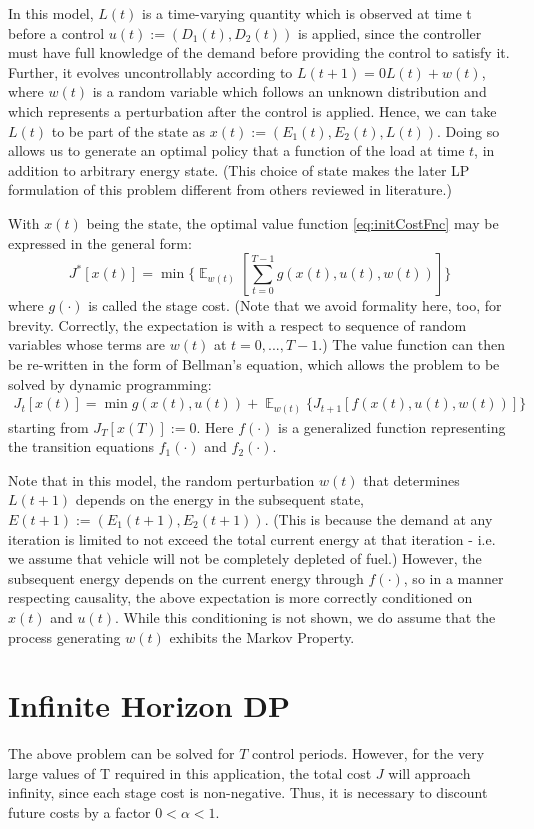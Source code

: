 \documentclass[conference]{IEEEtran}
\DeclareMathOperator{\E}{\mathbb{E}}
\begin{document}
In this model, $L(t)$ is a time-varying quantity which is observed at time t before a control $u(t):=(D_{1}(t),D_{2}(t))$ is applied, since the controller must have full knowledge of the demand before providing the control to satisfy it. Further, it evolves uncontrollably according to $L(t+1)=0L(t)+w(t)$, where $w(t)$ is a random variable which follows an unknown distribution and which represents a perturbation after the control is applied. Hence, we can take $L(t)$ to be part of the state as $x(t):=(E_{1}(t),E_{2}(t),L(t))$. Doing so allows us to generate an optimal policy that a function of the load at time $t$, in addition to arbitrary energy state. (This choice of state makes the later LP formulation of this problem different from others reviewed in literature.)

With $x(t)$ being the state, the optimal value function \eqref{eq:initCostFnc} may be expressed in the general form:
\begin{equation}J^{*}[x(t)]=\min \Biggl\{\mathop{\E}_{w(t)}\left[\sum_{t=0}^{T-1}g(x(t),u(t),w(t))\right]\Biggr\}\end{equation}
where $g(\cdot)$ is called the stage cost. (Note that we avoid formality here, too, for brevity. Correctly, the expectation is with a respect to sequence of random variables whose terms are $w(t)$ at $t=0,...,T-1$.) The value function can then be re-written in the form of Bellman's equation, which allows the problem to be solved by dynamic programming:
\begin{multline} \label{eq:FHDP}
J_{t}[x(t)]=\min g(x(t),u(t)) + \mathop{\E}_{w(t)} \{J_{t+1}[f(x(t),u(t),w(t))]\}
\end{multline}
starting from $J_{T}[x(T)]:=0$. Here $f(\cdot)$ is a generalized function representing the transition equations $f_{1}(\cdot)$ and $f_{2}(\cdot)$.

Note that in this model, the random perturbation $w(t)$ that determines $L(t+1)$ depends on the energy in the subsequent state, $E(t+1):=(E_{1}(t+1),E_{2}(t+1))$. (This is because the demand at any iteration is limited to not exceed the total current energy at that iteration - i.e. we assume that vehicle will not be completely depleted of fuel.) However, the subsequent energy depends on the current energy through $f(\cdot)$, so in a manner respecting causality, the above expectation is more correctly conditioned on $x(t)$ and $u(t)$. While this conditioning is not shown, we do assume that the process generating $w(t)$ exhibits the Markov Property.

\section{Infinite Horizon DP}
The above problem can be solved for $T$ control periods. However, for the very large values of T required in this application, the total cost $J$ will approach infinity, since each stage cost is non-negative. Thus, it is necessary to discount future costs by a factor $0<\alpha<1$.
\end{document}

